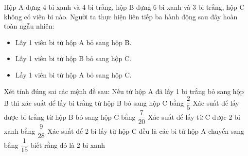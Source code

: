 \begin{ex}
	Hộp A đựng 4 bi xanh và 4 bi trắng, hộp B đựng 6 bi xanh và 3 bi trắng, hộp C không có viên bi nào. Người ta thực hiện liên tiếp ba hành động sau đây hoàn toàn ngẫu nhiên:
	\begin{itemize}
		\item Lấy 1 viên bi từ hộp A bỏ sang hộp B.
		\item Lấy 1 viên bi từ hộp B bỏ sang hộp C.
		\item Lấy 1 viên bi từ hộp A bỏ sang hộp C.
	\end{itemize}
	Xét tính đúng sai các mệnh đề sau:
	\choiceTF
	{Nếu từ hộp A đã lấy 1 bi trắng bỏ sang hộp B thì xác suất để lấy bi trắng từ hộp B bỏ sang hộp C bằng $\dfrac{2}{5}$}
	{\True Xác suất để lấy được bi trắng từ hộp B bỏ sang hộp C bằng $\dfrac{7}{20}$}
	{\True Xác suất để lấy từ C được 2 bi xanh bằng $\dfrac{9}{28}$}
	{\True Xác suất để 2 bi lấy từ hộp C đều là các bi từ hộp A chuyển sang bằng $\dfrac{1}{15}$ biết rằng đó là 2 bi xanh}
\end{ex}
